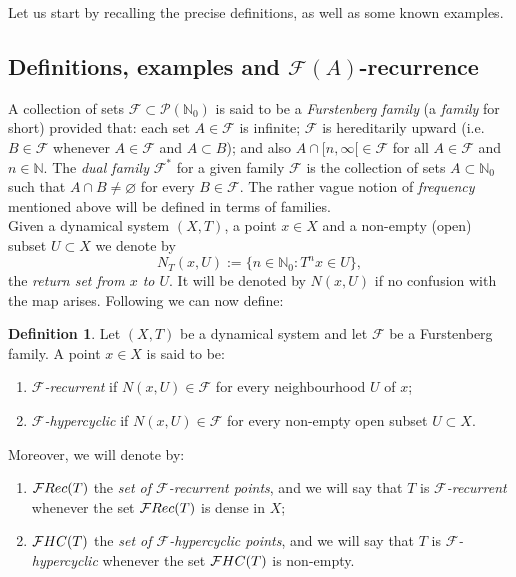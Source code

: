\documentclass[openright,11pt]{article}
\theoremstyle{plain}
\theoremstyle{definition}
\newtheorem{definition}[theorem]{Definition}
\newcommand{\NN}{\mathbb{N}}
\newcommand{\Fc}{\mathcal{F}}
\newcommand{\Part}{\mathscr{P}}
\newcommand{\Rec}{\textup{Rec}}
\newcommand{\HC}{\textup{HC}}
\begin{document}
Let us start by recalling the precise definitions, as well as some known examples.

\subsection{Definitions, examples and $\Fc(A)$-recurrence}

A collection of sets $\Fc \subset \Part(\NN_0)$ is said to be a {\em Furstenberg family} (a {\em family} for short) provided that: each set $A \in \Fc$ is infinite; $\Fc$ is hereditarily upward (i.e.\ $B \in \Fc$ whenever $A \in \Fc$ and $A \subset B$); and also $A\cap[n,\infty[ \in \Fc$ for all $A \in \Fc$ and $n \in \NN$. The {\em dual family} $\Fc^*$ for a given family $\Fc$ is the collection of sets $A \subset \NN_0$ such that $A \cap B\neq\varnothing$ for every $B \in \Fc$. The rather vague notion of {\em frequency} mentioned above will be defined in terms of families.\\[-5pt]

Given a dynamical system $(X,T)$, a point $x \in X$ and a non-empty (open) subset $U \subset X$ we denote by
\[
N_T(x,U) := \{ n \in \NN_0 : T^nx \in U \},
\]
the {\em return set from $x$ to $U$}. It will be denoted by $N(x,U)$ if no confusion with the map arises. Following \cite{BMPP2016,BMPP2019,BG2018,BoGrLoPe2022,CarMur2022_IEOT,CarMur2022_MS,CarMur2022_arXiv,GriLo2023,Lopez2024_RinM,Lopez2025_arXiv_frequently} we can now define:

\begin{definition}\label{Def:F-rec-hyp}
	Let $(X,T)$ be a dynamical system and let $\Fc$ be a Furstenberg family. A point $x \in X$ is said to be:
	\begin{enumerate}[--]
		\item {\em $\Fc$-recurrent} if $N(x,U) \in \Fc$ for every neighbourhood $U$ of $x$;
		
		\item {\em $\Fc$-hypercyclic} if $N(x,U) \in \Fc$ for every non-empty open subset $U \subset X$.
	\end{enumerate}
	Moreover, we will denote by:
	\begin{enumerate}[--]
		\item $\Fc\Rec(T)$ the {\em set of $\Fc$-recurrent points}, and we will say that $T$ is {\em $\Fc$-recurrent} whenever the set $\Fc\Rec(T)$ is dense in $X$;
		
		\item $\Fc\HC(T)$ the {\em set of $\Fc$-hypercyclic points}, and we will say that $T$ is {\em $\Fc$-hypercyclic} whenever the set $\Fc\HC(T)$ is non-empty.
	\end{enumerate}
\end{definition}
\end{document}
